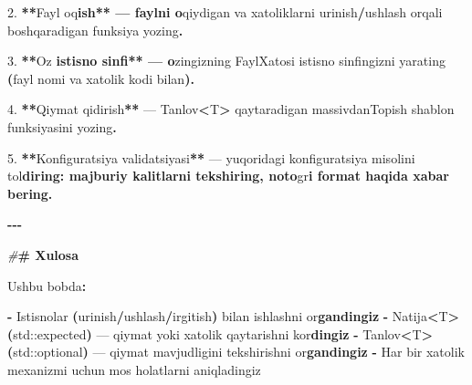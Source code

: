 \documentclass[a4paper,11pt,twoside,openright]{book}
\newenvironment{Shaded}{\begin{snugshade}}{\end{snugshade}}
\newcommand{\BuiltInTok}[1]{#1}
\newcommand{\CharTok}[1]{\textcolor[rgb]{0.31,0.60,0.02}{#1}}
\newcommand{\ErrorTok}[1]{\textcolor[rgb]{0.64,0.00,0.00}{\textbf{#1}}}
\newcommand{\FloatTok}[1]{\textcolor[rgb]{0.00,0.00,0.81}{#1}}
\newcommand{\NormalTok}[1]{#1}
\newcommand{\OperatorTok}[1]{\textcolor[rgb]{0.81,0.36,0.00}{\textbf{#1}}}
\newcommand{\PreprocessorTok}[1]{\textcolor[rgb]{0.56,0.35,0.01}{\textit{#1}}}
\begin{document}
\begin{Shaded}
\begin{Highlighting}[]
\FloatTok{2.} \OperatorTok{**}\NormalTok{Fayl o}\CharTok{\textquotesingle{}q}\ErrorTok{ish** — faylni o}\CharTok{\textquotesingle{}}\NormalTok{qiydigan va xatoliklarni }\ErrorTok{\textasciigrave{}}\NormalTok{urinish}\ErrorTok{\textasciigrave{}}\OperatorTok{/}\ErrorTok{\textasciigrave{}}\NormalTok{ushlash}\ErrorTok{\textasciigrave{}}\NormalTok{ orqali boshqaradigan funksiya yozing}\OperatorTok{.}

\FloatTok{3.} \OperatorTok{**}\NormalTok{O}\CharTok{\textquotesingle{}z}\ErrorTok{ istisno sinfi** — o}\CharTok{\textquotesingle{}}\NormalTok{zingizning }\ErrorTok{\textasciigrave{}}\NormalTok{FaylXatosi}\ErrorTok{\textasciigrave{}}\NormalTok{ istisno sinfingizni yarating }\OperatorTok{(}\NormalTok{fayl nomi va xatolik kodi bilan}\OperatorTok{).}

\FloatTok{4.} \OperatorTok{**}\NormalTok{Qiymat qidirish}\OperatorTok{**}\NormalTok{ — }\ErrorTok{\textasciigrave{}}\NormalTok{Tanlov}\OperatorTok{\textless{}}\NormalTok{T}\OperatorTok{\textgreater{}}\ErrorTok{\textasciigrave{}}\NormalTok{ qaytaradigan }\ErrorTok{\textasciigrave{}}\NormalTok{massivdanTopish}\ErrorTok{\textasciigrave{}}\NormalTok{ shablon funksiyasini yozing}\OperatorTok{.}

\FloatTok{5.} \OperatorTok{**}\NormalTok{Konfiguratsiya validatsiyasi}\OperatorTok{**}\NormalTok{ — yuqoridagi konfiguratsiya misolini to}\CharTok{\textquotesingle{}l}\ErrorTok{diring: majburiy kalitlarni tekshiring, noto}\CharTok{\textquotesingle{}}\NormalTok{g}\CharTok{\textquotesingle{}r}\ErrorTok{i format haqida xabar bering.}

\OperatorTok{{-}{-}{-}}

\PreprocessorTok{\#}\ErrorTok{\# Xulosa}

\NormalTok{Ushbu bobda}\OperatorTok{:}

\OperatorTok{{-}}\NormalTok{ Istisnolar }\OperatorTok{(}\ErrorTok{\textasciigrave{}}\NormalTok{urinish}\ErrorTok{\textasciigrave{}}\OperatorTok{/}\ErrorTok{\textasciigrave{}}\NormalTok{ushlash}\ErrorTok{\textasciigrave{}}\OperatorTok{/}\ErrorTok{\textasciigrave{}}\NormalTok{irgitish}\ErrorTok{\textasciigrave{}}\OperatorTok{)}\NormalTok{ bilan ishlashni o}\CharTok{\textquotesingle{}r}\ErrorTok{gandingiz}
\OperatorTok{{-}} \ErrorTok{\textasciigrave{}}\NormalTok{Natija}\OperatorTok{\textless{}}\NormalTok{T}\OperatorTok{\textgreater{}}\ErrorTok{\textasciigrave{}} \OperatorTok{(}\BuiltInTok{std::}\NormalTok{expected}\OperatorTok{)}\NormalTok{ — qiymat yoki xatolik qaytarishni ko}\CharTok{\textquotesingle{}r}\ErrorTok{dingiz}
\OperatorTok{{-}} \ErrorTok{\textasciigrave{}}\NormalTok{Tanlov}\OperatorTok{\textless{}}\NormalTok{T}\OperatorTok{\textgreater{}}\ErrorTok{\textasciigrave{}} \OperatorTok{(}\BuiltInTok{std::}\NormalTok{optional}\OperatorTok{)}\NormalTok{ — qiymat mavjudligini tekshirishni o}\CharTok{\textquotesingle{}r}\ErrorTok{gandingiz}
\OperatorTok{{-}}\NormalTok{ Har bir xatolik mexanizmi uchun mos holatlarni aniqladingiz}


\end{Highlighting}
\end{Shaded}
\end{document}
